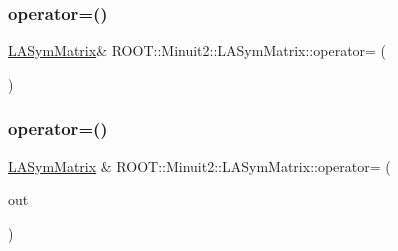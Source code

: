 \subsubsection{\texorpdfstring{operator=()}{operator=()}\hspace{0.1cm}{\footnotesize\ttfamily [13/14]}}
{\footnotesize\ttfamily \mbox{\hyperlink{classROOT_1_1Minuit2_1_1LASymMatrix}{L\+A\+Sym\+Matrix}}\& R\+O\+O\+T\+::\+Minuit2\+::\+L\+A\+Sym\+Matrix\+::operator= (\begin{DoxyParamCaption}\item[{const \mbox{\hyperlink{classROOT_1_1Minuit2_1_1ABObj}{A\+B\+Obj}}$<$ \mbox{\hyperlink{classROOT_1_1Minuit2_1_1sym}{sym}}, \mbox{\hyperlink{classROOT_1_1Minuit2_1_1VectorOuterProduct}{Vector\+Outer\+Product}}$<$ \mbox{\hyperlink{classROOT_1_1Minuit2_1_1ABObj}{A\+B\+Obj}}$<$ \mbox{\hyperlink{classROOT_1_1Minuit2_1_1vec}{vec}}, \mbox{\hyperlink{classROOT_1_1Minuit2_1_1LAVector}{L\+A\+Vector}}, double $>$, double $>$, double $>$ \&}]{ }\end{DoxyParamCaption})}

\mbox{\label{classROOT_1_1Minuit2_1_1LASymMatrix_a6d385d24fe98b336532837ad39f5c615}} 
\subsubsection{\texorpdfstring{operator=()}{operator=()}\hspace{0.1cm}{\footnotesize\ttfamily [14/14]}}
{\footnotesize\ttfamily \mbox{\hyperlink{classROOT_1_1Minuit2_1_1LASymMatrix}{L\+A\+Sym\+Matrix}} \& R\+O\+O\+T\+::\+Minuit2\+::\+L\+A\+Sym\+Matrix\+::operator= (\begin{DoxyParamCaption}\item[{const \mbox{\hyperlink{classROOT_1_1Minuit2_1_1ABObj}{A\+B\+Obj}}$<$ \mbox{\hyperlink{classROOT_1_1Minuit2_1_1sym}{sym}}, \mbox{\hyperlink{classROOT_1_1Minuit2_1_1VectorOuterProduct}{Vector\+Outer\+Product}}$<$ \mbox{\hyperlink{classROOT_1_1Minuit2_1_1ABObj}{A\+B\+Obj}}$<$ \mbox{\hyperlink{classROOT_1_1Minuit2_1_1vec}{vec}}, \mbox{\hyperlink{classROOT_1_1Minuit2_1_1LAVector}{L\+A\+Vector}}, double $>$, double $>$, double $>$ \&}]{out }\end{DoxyParamCaption})}

